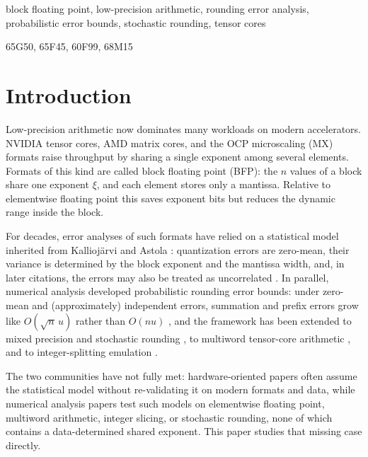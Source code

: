 \documentclass[review,hidelinks,oneeqnum,onetabnum,onefignum,onethmnum]{siamart251216}
\begin{document}
\begin{keywords}
block floating point, low-precision arithmetic, rounding error analysis,
probabilistic error bounds, stochastic rounding, tensor cores
\end{keywords}

\begin{MSCcodes}
65G50, 65F45, 60F99, 68M15
\end{MSCcodes}

\section{Introduction}
\label{sec:intro}

Low-precision arithmetic now dominates many workloads on modern accelerators.
NVIDIA tensor cores, AMD matrix cores, and the OCP microscaling (MX) formats
raise throughput by sharing a single exponent among several elements. Formats
of this kind are called block floating point (BFP): the $n$ values of a block
share one exponent $\xi$, and each element stores only a mantissa. Relative to
elementwise floating point this saves exponent bits but reduces the dynamic
range inside the block.

For decades, error analyses of such formats have relied on a statistical model
inherited from Kallioj\"arvi and Astola \cite{kalliojarvi1996}: quantization
errors are zero-mean, their variance is determined by the block exponent and
the mantissa width, and, in later citations, the errors may also be treated as
uncorrelated \cite{lian2019,song2018,fan2018,han2025}. In parallel, numerical
analysis developed probabilistic rounding error bounds: under zero-mean and
(approximately) independent errors, summation and prefix errors grow like
$O(\sqrt n\,u)$ rather than $O(nu)$
\cite{higham2002,higham2022,hallman2023}, and the framework has been extended
to mixed precision and stochastic rounding
\cite{higham2019,elarar2024,bhola2024a,bhola2024b,croci2022,drineas2024,elarar2026},
to multiword tensor-core arithmetic \cite{fasi2023}, and to integer-splitting
emulation \cite{abdelfattah2025}.

The two communities have not fully met: hardware-oriented papers often assume the
statistical model without re-validating it on modern formats and data, while
numerical analysis papers test such models on elementwise floating point, multiword
arithmetic, integer slicing, or stochastic rounding, none of which contains a
data-determined shared exponent. This paper studies that missing case directly.
\end{document}
